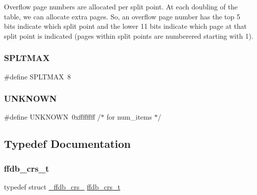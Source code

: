Overflow page numbers are allocated per split point. At each doubling of the table, we can allocate extra pages. So, an overflow page number has the top 5 bits indicate which split point and the lower 11 bits indicate which page at that split point is indicated (pages within split points are numberered starting with 1). \mbox{\label{adat-devel_2other__libs_2filedb_2filehash_2ffdb__hash_8h_a24fe9da2ed1da9fe5bd1ed053816820c}} 
\subsubsection{\texorpdfstring{SPLTMAX}{SPLTMAX}}
{\footnotesize\ttfamily \#define S\+P\+L\+T\+M\+AX~8}

\mbox{\label{adat-devel_2other__libs_2filedb_2filehash_2ffdb__hash_8h_ac1ae4add974b9cfc6b5aaf8a578f01ab}} 
\subsubsection{\texorpdfstring{UNKNOWN}{UNKNOWN}}
{\footnotesize\ttfamily \#define U\+N\+K\+N\+O\+WN~0xffffffff		/$\ast$ for num\+\_\+items $\ast$/}



\subsection{Typedef Documentation}
\mbox{\label{adat-devel_2other__libs_2filedb_2filehash_2ffdb__hash_8h_a103d84beefb6d7306cb252c4d7f25479}} 
\subsubsection{\texorpdfstring{ffdb\_crs\_t}{ffdb\_crs\_t}}
{\footnotesize\ttfamily typedef struct \mbox{\hyperlink{struct__ffdb__crs__}{\+\_\+ffdb\+\_\+crs\+\_\+}} \mbox{\hyperlink{adat-devel_2other__libs_2filedb_2filehash_2ffdb__hash_8h_a103d84beefb6d7306cb252c4d7f25479}{ffdb\+\_\+crs\+\_\+t}}}

